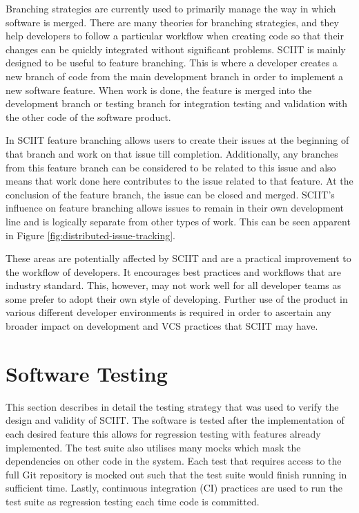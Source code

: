 \documentclass{mproj}
\begin{document}
Branching strategies are currently used to primarily manage the way in which software is merged. There are many theories for branching strategies, and they help developers to follow a particular workflow when creating code so that their changes can be quickly integrated without significant problems. SCIIT is mainly designed to be useful to feature branching. This is where a developer creates a new branch of code from the main development branch in order to implement a new software feature. When work is done, the feature is merged into the development branch or testing branch for integration testing and validation with the other code of the software product.

In SCIIT feature branching allows users to create their issues at the beginning of that branch and work on that issue till completion. Additionally, any branches from this feature branch can be considered to be related to this issue and also means that work done here contributes to the issue related to that feature. At the conclusion of the feature branch, the issue can be closed and merged. SCIIT’s influence on feature branching allows issues to remain in their own development line and is logically separate from other types of work. This can be seen apparent in Figure \ref{fig:distributed-issue-tracking}.

These areas are potentially affected by SCIIT and are a practical improvement to the workflow of developers. It encourages best practices and workflows that are industry standard. This, however, may not work well for all developer teams as some prefer to adopt their own style of developing. Further use of the product in various different developer environments is required in order to ascertain any broader impact on development and VCS practices that SCIIT may have.


\section{Software Testing} %

This section describes in detail the testing strategy that was used to verify the design and validity of SCIIT. The software is tested after the implementation of each desired feature this allows for regression testing with features already implemented. The test suite also utilises many mocks which mask the dependencies on other code in the system. Each test that requires access to the full Git repository is mocked out such that the test suite would finish running in sufficient time. Lastly, continuous integration (CI) practices are used to run the test suite as regression testing each time code is committed.
\end{document}
